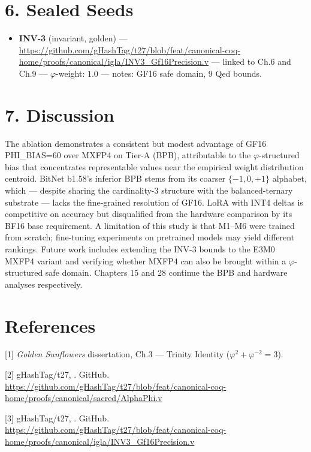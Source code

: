 \section{6. Sealed Seeds}\label{fa_09:sealed-seeds}

\begin{itemize}
\tightlist
\item
  \textbf{INV-3} (invariant, golden) ---
  \url{https://github.com/gHashTag/t27/blob/feat/canonical-coq-home/proofs/canonical/igla/INV3\_Gf16Precision.v}
  --- linked to Ch.6 and Ch.9 ---
  \(\varphi\)-weight: \(1.0\) --- notes: GF16 safe
  domain, 9 Qed bounds.
\end{itemize}

\section{7. Discussion}\label{fa_09:discussion}

The ablation demonstrates a consistent but modest
advantage of GF16 PHI\_BIAS=60 over MXFP4 on
Tier-A (BPB), attributable to the
\(\varphi\)-structured bias that concentrates
representable values near the empirical weight
distribution centroid. BitNet b1.58's inferior BPB
stems from its coarser \(\{-1,0,+1\}\) alphabet,
which --- despite sharing the cardinality-3
structure with the balanced-ternary substrate ---
lacks the fine-grained resolution of GF16. LoRA
with INT4 deltas is competitive on accuracy but
disqualified from the hardware comparison by its
BF16 base requirement. A limitation of this study
is that M1--M6 were trained from scratch;
fine-tuning experiments on pretrained models may
yield different rankings. Future work includes
extending the INV-3 bounds to the E3M0 MXFP4
variant and verifying whether MXFP4 can also be
brought within a \(\varphi\)-structured safe
domain. Chapters 15 and 28 continue the BPB and
hardware analyses respectively.

\section{References}\label{fa_09:references}

[1] \emph{Golden Sunflowers} dissertation,
Ch.3 --- Trinity Identity
(\(\varphi^2 + \varphi^{-2} = 3\)).

[2] gHashTag/t27,
.
GitHub.
\url{https://github.com/gHashTag/t27/blob/feat/canonical-coq-home/proofs/canonical/sacred/AlphaPhi.v}

[3] gHashTag/t27,
.
GitHub.
\url{https://github.com/gHashTag/t27/blob/feat/canonical-coq-home/proofs/canonical/igla/INV3\_Gf16Precision.v}

